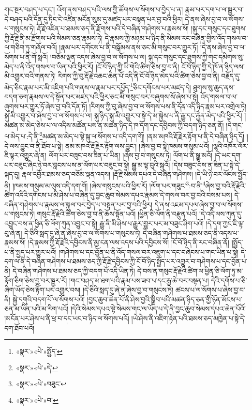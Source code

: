 གང་སྔར་བཤད་པ་དང་། འོག་ནས་བཤད་པའི་ལས་ཀྱི་ཚོགས་ལ་སོགས་པ་བྱེད་པ་ན། རྣམ་པར་དག་པ་ལ་སྦྱར་བ་དེ་བཤད་པའི་དོན་དུ་ཏིང་ངེ་འཛིན་མངོན་སུམ་དུ་མཛད་པར་བསྟན་པར་བྱ་བའི་ཕྱིར། དེ་ནས་ཞེས་བྱ་བ་ལ་སོགས་པ་གསུངས་ཏེ། རྡོ་རྗེ་འཛིན་པ་ཐམས་ཅད་ནི་རྫོགས་པའི་དེ་བཞིན་གཤེགས་པ་རྣམས་སོ། །སྐུ་དང་གསུང་དང་ཐུགས་ཀྱི་རྡོ་རྗེ་ནི་མ་རྫོགས་པའི་སེམས་ཅན་རྣམས་ཏེ། དེ་རྣམས་ཀྱི་མཉམ་པ་ཉིད་ནི་སེམས་རང་བཞིན་གྱིས་འོད་གསལ་བ་ལ་གཅིག་ཏུ་གཞོལ་བའོ། །རྣམ་པར་དགོངས་པ་ནི་བསྒོམས་ནས་ཅང་མི་གསུང་བར་གྱུར་ཏོ། །དེ་ནས་ཞེས་བྱ་བ་ལ་སོགས་པ་ནི་གོ་སླའོ། །བཅོམ་ལྡན་འདས་ཞེས་བྱ་བ་ལ་སོགས་པ་ལ། སྐུ་དང་གསུང་དང་ཐུགས་ཀྱི་གང་དམིགས་སུ་མེད་པ་ནི་འོད་གསལ་བ་ཡིན་པའི་ཕྱིར་རོ། །ངོ་བོ་ཉིད་ཀྱི་ཡི་གེའི་ཚིག་ཅེས་བྱ་བ་ནི། ངོ་བོ་ཉིད་ཀྱི་དེ་ཁོ་ན་ཉིད་ལས་མི་འགྱུར་བའི་གནས་ཏེ། རིགས་ཀྱི་བུ་རྡོ་རྗེ་འཆང་ཆེན་པོ་འདི་ནི་ངོ་བོ་ཉིད་མེད་པའི་ཚིག་ཅེས་བྱ་བ་ནི། བརྗོད་དུ་མེད་ཅིང་རྣམ་པར་མི་འཇིག་པའི་གནས་ལ་རྣམ་པར་དཔྱོད་\footnote{«སྣར་»«པེ་»སྤྱོད་}ཅིང་དགོངས་པར་མཛད་དེ། ཐུགས་སུ་ཆུད་ནས་བདག་ཅག་རྣམས་ལ་དེ་སྟོན་པར་མཛད་པའི་ཕྱིར་ཅང་མི་གསུང་བར་བཞུགས་སོ་ཞེས་པ་སྟེ། འོད་གསལ་བ་ལ་ཞུགས་པར་གྱུར་ཏོ་ཞེས་བྱ་བའི་དོན་ཏོ། །རིགས་ཀྱི་བུ་ཞེས་བྱ་བ་ལ་སོགས་པས་ནི་དོན་འདི་ཉིད་རྣམ་པར་འགྲེལ་ཏེ། སྐུ་མི་འགྱུར་བ་ཞེས་བྱ་བ་ལ་སོགས་པ་ལ། སྐུ་ཉིད་སྐུ་མི་འགྱུར་བ་སྟེ་དེ་མ་སྐྱེས་པ་ནི་རྒྱུ་དང་རྐྱེན་མེད་པའི་ཕྱིར་རོ། །མཚན་མ་མེད་ཅེས་པ་ལ་འདིས་མཚོན་པས་ན་མཚན་ཉིད་དེ་ཁ་དོག་དང་དབྱིབས་ཀྱི་བདག་ཉིད་ཅན་ནོ། །དེ་གང་ལ་མེད་པ་:དེ་ནི་\footnote{«སྣར་»«པེ་»དེ་}མཚན་མ་མེད་པ་སྟེ་སྐུ་ལ་སོགས་པ་འདི་དག་གོ། །ནམ་མཁའི་རྡོ་རྗེར་རྟོག་པ་ནི་དེ་བཞིན་ཉིད་དོ། །དེ་ལས་བྱུང་བ་ནི་ཐོབ་པ་སྟེ། ནམ་མཁའ་རྡོ་རྗེར་རྟོག་ལས་བྱུང་། །ཞེས་བྱ་བ་སྟེ་ཁམས་གསུམ་པའོ། །ལྷའི་འཁོར་ལོར་ཇི་ལྟར་འགྱུར་ཞེ་ན། ལོག་པར་བཟུང་བས་ཟིན་པ་ཡིན། །ཞེས་བྱ་བ་གསུངས་ཏེ། ལོག་པ་ནི་སྒྱུ་མའོ། །དེ་ཡང་དག་པར་བཟུང་ཞིང་ཉེ་བར་བླངས་པས་ན་ལོག་པར་བཟུང་བ་སྟེ། སྒྱུ་མ་ལྟ་བུའི་སྐུའོ། །དེས་བཟུང་བས་ན་ཟིན་པ་སྟེ་དེ་སྐད་དུ། རྣལ་འབྱོར་ཐམས་ཅད་བཅོམ་ལྡན་འདས། །རྡོ་རྗེ་སེམས་དཔའ་དེ་བཞིན་གཤེགས། །དེ་ཡི་ཉེ་བར་ལོངས་སྤྱོད་ནི། །ཁམས་གསུམ་མ་ལུས་འདི་དག་གོ། །ཞེས་གསུངས་པའི་ཕྱིར་རོ། །ལོག་པར་གཟུང་\footnote{«སྣར་»«པེ་»བཟུང་}:བ་ནི་\footnote{«སྣར་»«པེ་»བ་}ཞེས་བྱ་བའི་རྡོ་རྗེའི་ཚིག་འདིའི་དགོངས་པ་མི་ཤེས་པ་བཞིན་དུ་བྱང་ཆུབ་སེམས་དཔའ་རྣམས་དེ་གསལ་བར་བྱ་བའི་བསམ་པས། དེ་བཞིན་གཤེགས་པ་རྣམས་ལ་སྐུལ་བར་བྱེད་པ་བསྟན་པར་བྱ་བའི་ཕྱིར། དེ་ནས་འཇམ་དཔལ་ཞེས་བྱ་བ་ལ་སོགས་པ་གསུངས་ཏེ། གསུང་རྡོ་རྗེའི་ཚིག་ཅེས་བྱ་བ་ནི་ཆོས་སྟོན་པའོ། །ཕྱིན་ཅི་ལོག་ནི་བརྫུན་པའོ། །དེ་འདི་ལས་ཀུན་དུ་འབྱུང་བས་ན་ཕྱིན་ཅི་ལོག་ཀུན་འབྱུང་བ་སྟེ། རྒྱུ་ནི་མི་ཤེས་པ་རྒྱུར་གྱུར་པར་མ་བཟུང་ཤིག་པའོ། །དེ་དག་ཀྱང་ཇི་ལྟ་བུ་ཞེ་ན། དེ་ཅིའི་སླད་དུ་ཞེ་ན་ཞེས་བྱ་བ་ལ་སོགས་པ་གསུངས་ཏེ། དེ་བཞིན་གཤེགས་པ་ཐམས་ཅད་ནི་འདས་པ་རྣམས་སོ། །དེ་རྣམས་ཀྱི་རྡོ་རྗེའི་དབྱིངས་ནི་མྱ་ངན་ལས་འདས་པའི་དབྱིངས་སོ། །ངོ་བོ་ཉིད་ནི་རང་བཞིན་ནོ། །སྤྱོད་པ་ནི་སྤྱད་པར་གྱུར་པའོ། །གཤེགས་པ་དང་བྱོན་པ་ནི་འོད་གསལ་བར་འཇུག་པ་དང་བཞེངས་པ་གང་ཡིན་པ་སྟེ། དེ་དག་ལ་ནི་དེ་བཞིན་གཤེགས་པ་ཐམས་ཅད་ཀྱི་རྡོ་རྗེ་དབྱིངས་ཀྱི་ངོ་བོ་ཉིད་སྤྱོད་པར་འགྱུར་བ་གཤེགས་པ་དང་བྱོན་པ་ནི། དེ་བཞིན་གཤེགས་པ་ཐམས་ཅད་ཀྱི་བདག་པོ་འདི་ཡིན་ཏེ། དེ་བས་ན་གསུང་རྡོ་རྗེའི་ཚིག་ལ་ཕྱིན་ཅི་ལོག་ཏུ་མ་རྟོག་ཅིག་ཅེས་བྱ་བར་སྦྱར་རོ། །གང་བཤད་མ་ཐག་པའི་རྣམ་པས་ཟབ་པ་དང་རྒྱ་ཆེ་བར་བསྟན་པ། དེའི་དགོས་པ་ཅི་ཞིག་ཡོད་ཅེས་རྟོག་པར་འགྱུར་བས། །དེ་ཅིའི་སླད་དུ་ཞེ་ན་ཞེས་བྱ་བ་གསུངས་ཏེ། ཚངས་པ་ལ་སོགས་པ་ཞེས་བྱ་བ་ནི། སྐྱེ་དགུའི་བདག་པོ་ལ་སོགས་པའོ། །བྱང་ཆུབ་ཆེན་པོ་ནི་ཤེས་བྱའི་སྒྲིབ་པའི་མཚན་ཉིད་ཅན་གྱི་ཉོན་མོངས་པ་ཅན་མ་ཡིན་པའི་མ་རིག་པའོ། །དེའི་སེམས་དཔའ་སྟེ་སེམས་གང་ལ་ཡོད་པ་དེ་ནི་བྱང་ཆུབ་སེམས་དཔའ་ཆེན་པོའོ། །མངོན་པར་ཤེས་པ་ནི་ཕྲ་བ་དང་ཡང་བ་ཉིད་ལ་སོགས་པའོ། །ཡེ་ཤེས་ནི་འཇིག་རྟེན་པའི་ཐམས་ཅད་མཁྱེན་པ་སྟེ་དེ་དག་ཐོབ་པའོ། 
